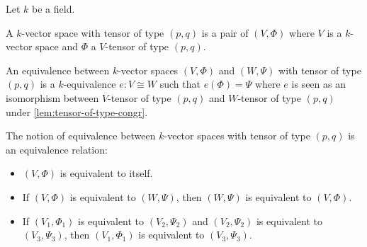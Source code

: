 Let $k$ be a field.

\begin{definition}
  A $k$-vector space with tensor of type $(p, q)$ is a pair of $(V, \Phi)$ where $V$ is a $k$-vector space and $\Phi$ a $V$-tensor of type $(p, q)$.
  \leanok%
\end{definition}

\begin{definition}
  An equivalence between $k$-vector spaces $(V, \Phi)$ and $(W, \Psi)$ with tensor of type $(p, q)$ is a $k$-equivalence $e : V \cong W$ such that $e(\Phi) = \Psi$ where $e$ is seen as an isomorphism between $V$-tensor of type $(p, q)$ and $W$-tensor of type $(p, q)$ under \cref{lem:tensor-of-type-congr}.
  \leanok%
\end{definition}

\begin{lemma}
  The notion of equivalence between $k$-vector spaces with tensor of type $(p, q)$ is an equivalence relation:
  \begin{itemize}
    \item $(V, \Phi)$ is equivalent to itself.
    \item If $(V, \Phi)$ is equivalent to $(W, \Psi)$, then $(W, \Psi)$ is equivalent to $(V, \Phi)$.
    \item If $(V_{1}, \Phi_{1})$ is equivalent to $(V_{2}, \Psi_{2})$ and $(V_{2}, \Psi_{2})$ is equivalent to $(V_{3}, \Psi_{3})$, then $(V_{1}, \Phi_{1})$ is equivalent to $(V_{3}, \Psi_{3})$.
  \end{itemize}
  \leanok%
\end{lemma}

